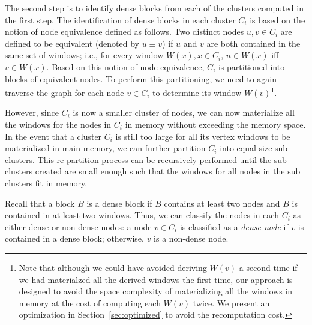 The second step is to identify dense blocks from each of the clusters computed in the first step.
The identification of dense blocks in each cluster $C_i$ is based on the notion of node equivalence defined as follows.
Two distinct nodes $u, v \in C_i$ are defined to be equivalent (denoted by $u \equiv v$)
if $u$ and $v$ are both contained in the same set of windows;
i.e., for every window $W(x), x \in C_i$, $u \in W(x)$ iff $v \in W(x)$.
Based on this notion of node equivalence, $C_i$ is partitioned into blocks of equivalent nodes.
To perform this partitioning, we need to again traverse the graph for each node $v \in C_i$ to 
determine its window $W(v)$\footnote{
Note that although we could have avoided deriving $W(v)$ a second time if we had materialzed all the derived windows the first time, our approach is designed to avoid the space complexity of materializing all the windows in memory at the cost of computing each $W(v)$ twice. We present an optimization in Section~\ref{sec:optimized} to avoid the recomputation cost.
}.

However, since $C_i$ is now a smaller cluster of nodes, we can now materialize all the windows for the nodes in $C_i$ in memory without exceeding the memory space. In the event that a cluster $C_i$ is still too large for all its vertex windows to be materialized in main memory, we can further partition $C_i$ into equal size sub-clusters. This re-partition process can be recursively performed until the sub clusters created are small enough such that the windows for all nodes in the sub clusters fit in memory. 


Recall that a block $B$ is a dense block if $B$ contains at least two nodes and
$B$ is contained in at least two windows.
Thus, we can classify the nodes in each $C_i$ as either dense or non-dense nodes:
a node $v \in C_i$ is classified as a {\it dense node} if $v$ is contained in a dense block;
otherwise, $v$ is a non-dense node.

